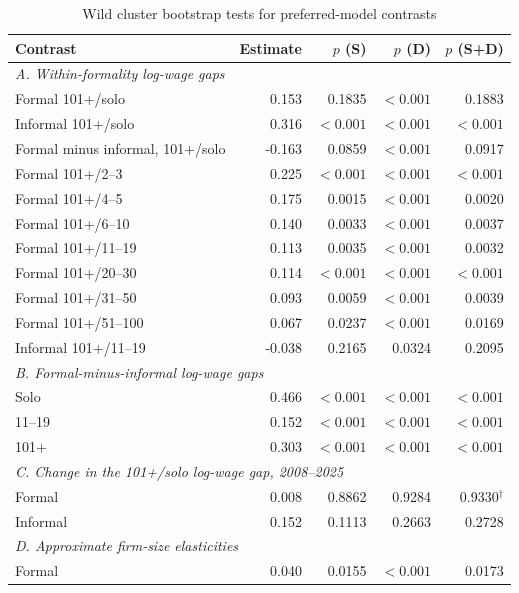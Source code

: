 \begin{table}[htbp]
  \centering
  \caption{Wild cluster bootstrap tests for preferred-model contrasts}
  \label{tab:preferred-wild-bootstrap}
  \small
  \setlength{\tabcolsep}{5pt}
  \begin{tabular}{@{}p{}rrrr@{}}
    \toprule
    Contrast & Estimate & $p$ (S) & $p$ (D) & $p$ (S+D) \\
    \midrule
    \multicolumn{5}{l}{\textit{A. Within-formality log-wage gaps}} \\
    Formal 101+/solo & 0.153 & 0.1835 & $<0.001$ & 0.1883 \\
    Informal 101+/solo & 0.316 & $<0.001$ & $<0.001$ & $<0.001$ \\
    Formal minus informal, 101+/solo & -0.163 & 0.0859 & $<0.001$ & 0.0917 \\
    Formal 101+/2--3 & 0.225 & $<0.001$ & $<0.001$ & $<0.001$ \\
    Formal 101+/4--5 & 0.175 & 0.0015 & $<0.001$ & 0.0020 \\
    Formal 101+/6--10 & 0.140 & 0.0033 & $<0.001$ & 0.0037 \\
    Formal 101+/11--19 & 0.113 & 0.0035 & $<0.001$ & 0.0032 \\
    Formal 101+/20--30 & 0.114 & $<0.001$ & $<0.001$ & $<0.001$ \\
    Formal 101+/31--50 & 0.093 & 0.0059 & $<0.001$ & 0.0039 \\
    Formal 101+/51--100 & 0.067 & 0.0237 & $<0.001$ & 0.0169 \\
    Informal 101+/11--19 & -0.038 & 0.2165 & 0.0324 & 0.2095 \\
    \midrule
    \multicolumn{5}{l}{\textit{B. Formal-minus-informal log-wage gaps}} \\
    Solo & 0.466 & $<0.001$ & $<0.001$ & $<0.001$ \\
    11--19 & 0.152 & $<0.001$ & $<0.001$ & $<0.001$ \\
    101+ & 0.303 & $<0.001$ & $<0.001$ & $<0.001$ \\
    \midrule
    \multicolumn{5}{l}{\textit{C. Change in the 101+/solo log-wage gap, 2008--2025}} \\
    Formal & 0.008 & 0.8862 & 0.9284 & 0.9330$^{\dagger}$ \\
    Informal & 0.152 & 0.1113 & 0.2663 & 0.2728 \\
    \midrule
    \multicolumn{5}{l}{\textit{D. Approximate firm-size elasticities}} \\
    Formal & 0.040 & 0.0155 & $<0.001$ & 0.0173 \\

\end{tabular}
\end{table}
